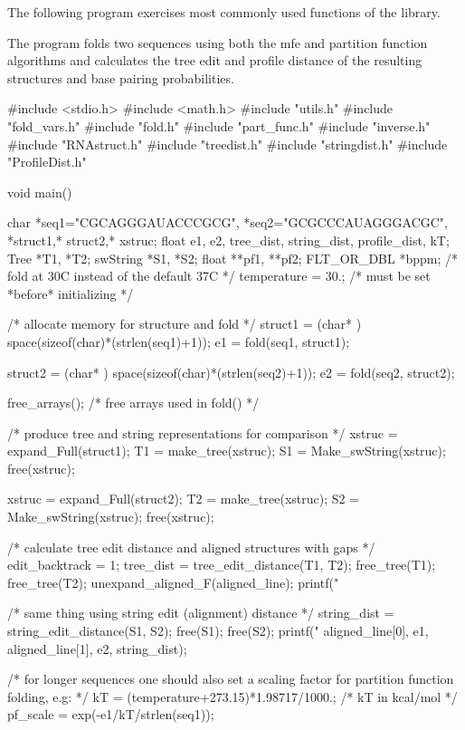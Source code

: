 The following program exercises most commonly used functions of the library.

The program folds two sequences using both the mfe and partition function algorithms and calculates the tree edit and profile distance of the resulting structures and base pairing probabilities.

\begin{DoxyVerb}
#include  <stdio.h>
#include  <math.h>
#include  "utils.h"
#include  "fold_vars.h"
#include  "fold.h"
#include  "part_func.h"
#include  "inverse.h"
#include  "RNAstruct.h"
#include  "treedist.h"
#include  "stringdist.h"
#include  "ProfileDist.h"

void main()
{
   char *seq1="CGCAGGGAUACCCGCG", *seq2="GCGCCCAUAGGGACGC",
        *struct1,* struct2,* xstruc;
   float e1, e2, tree_dist, string_dist, profile_dist, kT;
   Tree *T1, *T2;
   swString *S1, *S2;
   float **pf1, **pf2;
   FLT_OR_DBL *bppm;
   /* fold at 30C instead of the default 37C */
   temperature = 30.;      /* must be set *before* initializing  */

   /* allocate memory for structure and fold */
   struct1 = (char* ) space(sizeof(char)*(strlen(seq1)+1));
   e1 =  fold(seq1, struct1);

   struct2 = (char* ) space(sizeof(char)*(strlen(seq2)+1));
   e2 =  fold(seq2, struct2);

   free_arrays();     /* free arrays used in fold() */

   /* produce tree and string representations for comparison */
   xstruc = expand_Full(struct1);
   T1 = make_tree(xstruc);
   S1 = Make_swString(xstruc);
   free(xstruc);

   xstruc = expand_Full(struct2);
   T2 = make_tree(xstruc);
   S2 = Make_swString(xstruc);
   free(xstruc);

   /* calculate tree edit distance and aligned structures with gaps */
   edit_backtrack = 1;
   tree_dist = tree_edit_distance(T1, T2);
   free_tree(T1); free_tree(T2);
   unexpand_aligned_F(aligned_line);
   printf("%

   /* same thing using string edit (alignment) distance */
   string_dist = string_edit_distance(S1, S2);
   free(S1); free(S2);
   printf("%
          aligned_line[0], e1, aligned_line[1], e2, string_dist);

   /* for longer sequences one should also set a scaling factor for
      partition function folding, e.g: */
   kT = (temperature+273.15)*1.98717/1000.;  /* kT in kcal/mol */
   pf_scale = exp(-e1/kT/strlen(seq1));

}
\end{DoxyVerb}
